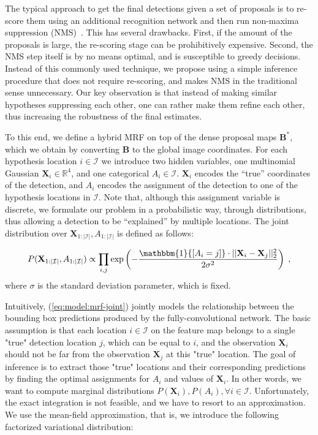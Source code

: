 \documentclass[10pt,twocolumn,letterpaper]{article}
\newcommand{\bB}[0]{\mathbf{B}}
\newcommand{\bX}[0]{\mathbf{X}}
\newcommand{\mR}[0]{\mathbb{R}}
\newcommand{\mI}[0]{\mathcal{I}}
\newcommand{\ONE}[0]{\mathbbm{1}}
\begin{document}
The typical approach to get the final detections given a set of proposals is to
re-score them using an additional recognition network and then run non-maxima
suppression (NMS)~\cite{Johnson2016, Ren2015}. This has several
drawbacks. First, if the amount of the proposals is large, the re-scoring stage can
be prohibitively expensive. Second, the NMS step itself is by no means optimal, and is
susceptible to greedy decisions. Instead of this commonly used technique, we
propose using a simple inference procedure that does not require re-scoring, and
makes NMS in the traditional sense unnecessary. Our key observation is that instead
of making similar hypotheses suppressing each other, one can rather make them
refine each other, thus increasing the robustness of the final estimates.

To this end, we define a hybrid MRF on top of the dense
proposal maps $\bB^*$, which we obtain by converting $\bB$ to the global image
coordinates.  For each hypothesis location $i \in \mI$ we introduce two hidden
variables, one multinomial Gaussian $\bX_i \in \mR^4$, and one categorical $A_i
\in \mI$. $\bX_i$ encodes the ``true'' coordinates of the detection, and $A_i$
encodes the assignment of the detection to one of the
hypothesis locations in $\mI$. Note that, although this assignment variable is discrete,
we  formulate our problem in a probabilistic way, through distributions, thus
allowing a detection to be ``explained'' by multiple locations. The joint
distribution over $\bX_{1:|\mI|}, A_{1:|\mI|}$ is defined as follows:

\vspace{-0.25cm}
\begin{equation}
P(\bX_{1:|\mI|}, A_{1: |\mI|}) \propto \prod_{i,j} \exp
\left(
- \frac{\ONE{[A_i = j]} \cdot ||\bX_i - \bX_j||_2^2}{2 \sigma^2} 
\right)\;,
\label{eq:model:mrf-joint}
\end{equation}
where $\sigma$ is the standard deviation parameter, which is fixed.

Intuitively, (\ref{eq:model:mrf-joint}) jointly models the relationship between 
the bounding box predictions produced by the fully-convolutional network. 
The basic assumption is that each location $i \in \mI$ on the feature map 
belongs to a single "true" detection location $j$, which can be equal to $i$, 
and the observation $\bX_i$ should not be far from the observation $\bX_j$ at this "true"
location. The goal of inference is to extract those "true" locations
and their corresponding predictions by finding the optimal assignments for $A_i$ and
values of $\bX_i$. In other words, we want to compute marginal distributions
$P(\bX_{i}), P(A_i), \forall i \in \mI$. Unfortunately, the exact integration is not
feasible, and we have to resort to an approximation. We use the mean-field approximation, 
that is, we introduce the following factorized variational distribution: 
\end{document}
